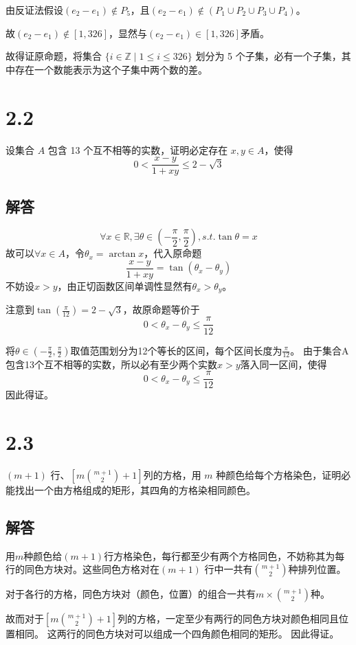 \documentclass[12pt]{article}
\begin{document}
由反证法假设$(e_{2}-e_{1}) \notin P_{5}$，且$(e_{2}-e_{1}) \notin (P_{1}\cup P_{2} \cup P_{3} \cup P_{4})$。

故$(e_{2}-e_{1}) \notin [1,326]$，显然与$(e_{2}-e_{1}) \in [1,326]$矛盾。

故得证原命题，将集合 $\{ i \in \mathbb{Z} \mid 1 \leq i \leq 326 \}$ 划分为 5 个子集，必有一个子集，其中存在一个数能表示为这个子集中两个数的差。

\section*{2.2}
设集合 $A$ 包含 13 个互不相等的实数，证明必定存在 $x, y \in A$，使得
\[0 < \frac{x - y}{1 + xy} \leq 2 - \sqrt{3}\]
\subsection*{解答}
\[\forall x \in \mathbb{R}, \exists \theta \in \left( -\frac{\pi}{2}, \frac{\pi}{2} \right), s.t. \tan{\theta} = x\]
故可以$\forall x \in A$，令$\theta_{x} = \arctan{x}$，代入原命题
\[\frac{x - y}{1 + xy} = \tan{(\theta_x - \theta_y)}\]
不妨设$x>y$，由正切函数区间单调性显然有$\theta_{x}>\theta_{y}$。

注意到$\tan{\left( \frac{\pi}{12} \right)} = 2 - \sqrt{3}$，故原命题等价于 
\[0 < \theta_x - \theta_y \leq \frac{\pi}{12} \]

将$\theta \in \left( -\frac{\pi}{2}, \frac{\pi}{2} \right)$取值范围划分为12个等长的区间，每个区间长度为$\frac{\pi}{12}$。
由于集合A包含13个互不相等的实数，所以必有至少两个实数$x>y$落入同一区间，使得
\[0 < \theta_x - \theta_y \leq \frac{\pi}{12} \]
因此得证。

\section*{2.3}
$(m+1)$ 行、$\left[ m \binom{m+1}{2} + 1 \right]$列的方格，用 $m$ 种颜色给每个方格染色，证明必能找出一个由方格组成的矩形，其四角的方格染相同颜色。
\subsection*{解答}
用$m$种颜色给$(m+1)$行方格染色，每行都至少有两个方格同色，不妨称其为每行的同色方块对。这些同色方格对在$(m+1)$ 行中一共有$\binom{m+1}{2}$种排列位置。

对于各行的方格，同色方块对（颜色，位置）的组合一共有$m \times \binom{m+1}{2}$种。

故而对于$\left[ m \binom{m+1}{2} + 1 \right]$列的方格，一定至少有两行的同色方块对颜色相同且位置相同。
这两行的同色方块对可以组成一个四角颜色相同的矩形。
因此得证。
\end{document}
